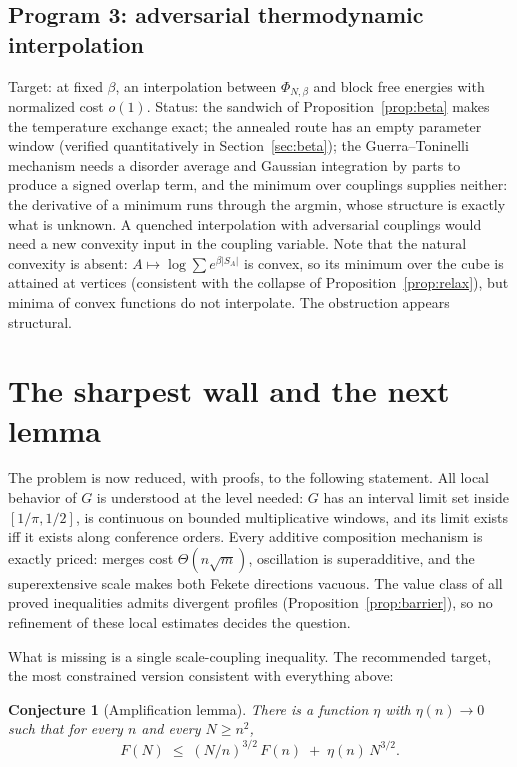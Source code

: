 \documentclass[11pt]{article}
\newtheorem{conjecture}[theorem]{Conjecture}
\theoremstyle{remark}
\begin{document}
\subsection*{Program 3: adversarial thermodynamic interpolation}
Target: at fixed $\beta$, an interpolation between $\Phi_{N,\beta}$
and block free energies with normalized cost $o(1)$. Status: the
sandwich of Proposition~\ref{prop:beta} makes the temperature exchange
exact; the annealed route has an empty parameter window (verified
quantitatively in Section~\ref{sec:beta}); the Guerra--Toninelli
mechanism \cite{gt} needs a disorder average and Gaussian integration
by parts to produce a signed overlap term, and the minimum over
couplings supplies neither: the derivative of a minimum runs through
the argmin, whose structure is exactly what is unknown. A quenched
interpolation with adversarial couplings would need a new convexity
input in the coupling variable. Note that the natural convexity is
absent: $A\mapsto\log\sum e^{\beta|S_A|}$ is convex, so its minimum
over the cube is attained at vertices (consistent with the collapse of
Proposition~\ref{prop:relax}), but minima of convex functions do not
interpolate. The obstruction appears structural.

\section{The sharpest wall and the next lemma}\label{sec:wall}

The problem is now reduced, with proofs, to the following statement.
All local behavior of $G$ is understood at the level needed: $G$ has
an interval limit set inside $[1/\pi,1/2]$, is continuous on bounded
multiplicative windows, and its limit exists iff it exists along
conference orders. Every additive composition mechanism is exactly
priced: merges cost $\Theta(n\sqrt m)$, oscillation is superadditive,
and the superextensive scale makes both Fekete directions vacuous. The
value class of all proved inequalities admits divergent profiles
(Proposition~\ref{prop:barrier}), so no refinement of these local
estimates decides the question.

What is missing is a single scale-coupling inequality. The recommended
target, the most constrained version consistent with everything above:

\begin{conjecture}[Amplification lemma]\label{conj:amp}
There is a function $\eta$ with $\eta(n)\to0$ such that for every $n$
and every $N\ge n^2$,
\[
 F(N)\;\le\;(N/n)^{3/2}\,F(n)\;+\;\eta(n)\,N^{3/2}.
\]
\end{conjecture}
\end{document}
